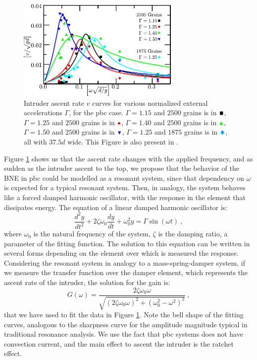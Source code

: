 \begin{figure}[H]
    \centering
    \includegraphics[width=0.7\textwidth]{04-figuras/BNE_ResonancePBC.pdf}
    \caption[BNE with periodic boundary: resonance.]{Intruder ascent rate $v$ curves for various normalized external accelerations $ \Gamma $, for the pbc case. $\Gamma = 1.15$ and $2500$ grains is in $\textcolor{black}{\blacksquare}$, $\Gamma = 1.25$ and $2500$ grains is in $\textcolor{red}{\bullet}$, $\Gamma = 1.40$ and $2500$ grains is in $\textcolor{green}{\blacktriangle}$, $\Gamma = 1.50$ and $2500$ grains is in $\textcolor{blue}{\blacktriangledown}$, $\Gamma = 1.25$ and $1875$ grains is in $\textcolor{cyan}{\Diamondblack}$, all with $37.5d$ wide. This Figure is also present in \cite{Large-deviation_quantification_of_boundary_conditions_on_the_Brazil_nut_effect}.}
    \label{fig:BNE_resonance}
\end{figure}

    Figure \ref{fig:BNE_resonance} shows us that the ascent rate changes with the applied frequency, and as sudden as the intruder ascent to the top, we propose that the behavior of the BNE in pbc could be modelled as a resonant system, since that dependency on $\omega$ is expected for a typical resonant system. Then, in analogy, the system behaves like a forced damped harmonic oscillator, with the response in the element that dissipates energy. The equation of a linear damped harmonic oscillator is:
%
\begin{equation}
    \frac{d^2 y}{d t^2} + 2 \zeta \omega_0 \frac{d y} {d t} + \omega_0^2 y = \Gamma \sin(\omega t) ~,  
\end{equation}
%
where $\omega_0$ is the natural frequency of the system, $\zeta$ is the damping ratio, a parameter of the fitting function. The solution to this equation can be written in several forms depending on the element over which is measured the response. Considering the resonant system in analogy to a mass-spring-damper system, if we measure the transfer function over the damper element, which represents the ascent rate of the intruder, the solution for the gain is:
%
\begin{equation}
    G(\omega) = \frac{2 \zeta \omega_0 \omega }{ \sqrt{(2 \zeta \omega_0 \omega)^2 + (\omega_0^2 - \omega^2)^2 }}~,
    \label{equ:TF}
\end{equation}
%
that we have used to fit the data in Figure \ref{fig:BNE_resonance}. Note the bell shape of the fitting curves, analogous to the sharpness curve for the amplitude magnitude typical in traditional resonance analysis. We use the fact that pbc systems does not have convection current, and the main effect to ascent the intruder is the ratchet effect.


